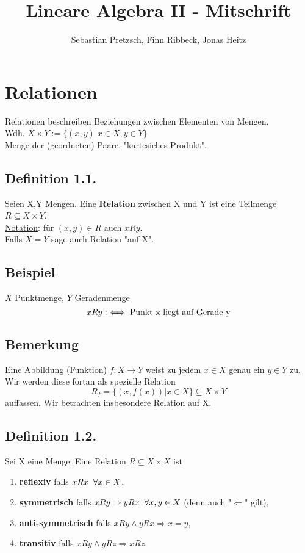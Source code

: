 \documentclass {article}
\begin{document}
\title{Lineare Algebra II - Mitschrift}
\author{Sebastian Pretzsch, Finn Ribbeck, Jonas Heitz}
\maketitle

\section{Relationen}
Relationen beschreiben Beziehungen zwischen Elementen von Mengen. \\
Wdh. $X{\times}Y := \{(x,y) | x \in X, y \in Y\}$ \\
Menge der (geordneten) Paare, "kartesiches Produkt".

\subsection*{Definition 1.1.}
Seien X,Y Mengen. Eine \textbf{Relation} zwischen X und Y ist eine Teilmenge $R \subseteq X{\times}Y$. \\
\underline{Notation}: für $(x,y)\in R$ auch $xRy$. \\
Falls $X=Y$ sage auch Relation "auf X".

\subsection*{Beispiel}
$X$ Punktmenge, $Y$ Geradenmenge
$$xRy :\iff \textnormal{Punkt x liegt auf Gerade y}$$

\subsection*{Bemerkung}
Eine Abbildung (Funktion) $f:X{\to}Y$ weist zu jedem $x\in X$ genau ein $
y\in Y$ zu. \\
Wir werden diese fortan als spezielle Relation
$$R_f = \{(x, f(x)) | x\in X\} \subseteq X{\times}Y$$
auffassen. Wir betrachten insbesondere Relation auf X.

\subsection*{Definition 1.2.}
Sei X eine Menge. Eine Relation $R \subseteq X{\times}X$ ist
\begin{enumerate}[label=(\alph*)]
\item \textbf{reflexiv} falls $xRx \hspace*{2mm}\forall x\in X$,
\item \textbf{symmetrisch} falls $xRy \Rightarrow yRx \hspace*{2mm}\forall x,y\in X$ (denn auch "$\Leftarrow$" gilt),
\item \textbf{anti-symmetrisch} falls $xRy \land yRx \Rightarrow x=y$,
\item \textbf{transitiv} falls $xRy \land yRz \Rightarrow xRz$.
\end{enumerate}
\end{document}
